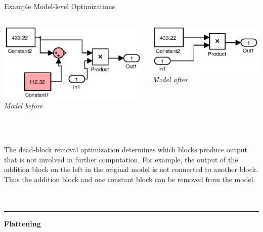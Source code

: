 \documentclass[final,hyperref={pdfpagelabels=false}]{beamer}
\begin{document}
\begin{frame}{}
\begin{columns}[t,totalwidth=\linewidth]
\begin{column}{.585\linewidth}
\begin{block}{Example Model-level Optimizations}
\begin{columns}[c,totalwidth=\linewidth]
\begin{column}{.485\linewidth}
\begin{center}
         \includegraphics[width=0.8\linewidth]{images/models/HSimpleConstDead}\\
          \footnotesize \textit{Model before}
         \end{center}
         \end{column}
         \begin{column}{.485\linewidth}
         \begin{center}
         \vspace{1.2cm}
         \includegraphics[width=0.8\linewidth]{images/models/HSimpleConstDead_export}\\
        \footnotesize \textit{Model after}
         \end{center}
         \end{column}
         \end{columns}
          \footnotesize ~\\~\\
         The dead-block removal optimization determines which blocks produce output that is not involved in further computation. For example, the output of the addition block on the left in the original model is not connected to another block. Thus the addition block and one constant block can be removed from the model.
          ~\\~\\
         \hrule
         \small
          \begin{center}\textbf{Flattening}\end{center}

\end{block}
\end{column}
\end{columns}
\end{frame}
\end{document}
